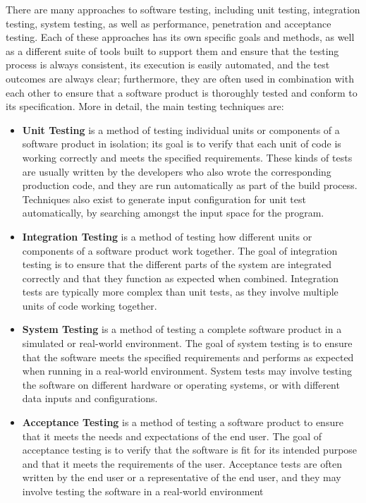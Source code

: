 There are many approaches to software testing, including unit testing, integration testing, system testing, as well as performance, penetration and acceptance testing. Each of these approaches has its own specific goals and methods, as well as a different suite of tools built to support them and ensure that the testing process is always consistent, its execution is easily automated, and the test outcomes are always clear; furthermore, they are often used in combination with each other to ensure that a software product is thoroughly tested and conform to its specification. 
More in detail, the main testing techniques are: 
\begin{itemize}
    \item \textbf{Unit Testing} is a method of testing individual units or components of a software product in isolation; its goal is to verify that each unit of code is working correctly and meets the specified requirements. These kinds of tests are usually written by the developers who also wrote the corresponding production code, and they are run automatically as part of the build process. Techniques also exist to generate input configuration for unit test automatically, by searching amongst the input space for the program.
    \item \textbf{Integration Testing} is a method of testing how different units or components of a software product work together. The goal of integration testing is to ensure that the different parts of the system are integrated correctly and that they function as expected when combined. Integration tests are typically more complex than unit tests, as they involve multiple units of code working together.
    \item \textbf{System Testing} is a method of testing a complete software product in a simulated or real-world environment. The goal of system testing is to ensure that the software meets the specified requirements and performs as expected when running in a real-world environment. System tests may involve testing the software on different hardware or operating systems, or with different data inputs and configurations.
    \item \textbf{Acceptance Testing} is a method of testing a software product to ensure that it meets the needs and expectations of the end user. The goal of acceptance testing is to verify that the software is fit for its intended purpose and that it meets the requirements of the user. Acceptance tests are often written by the end user or a representative of the end user, and they may involve testing the software in a real-world environment

\end{itemize}
